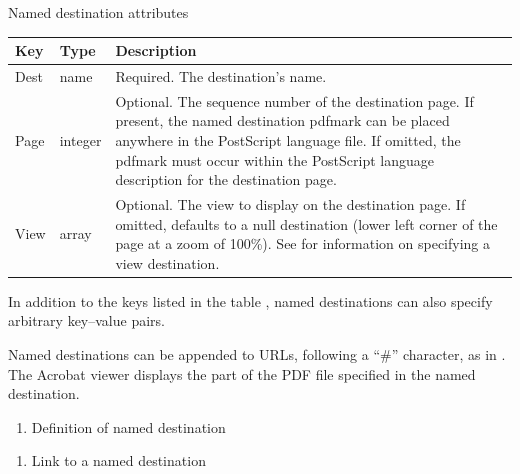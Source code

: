 \documentclass[letterpaper,12pt,english,openany,oneside]{sphinxmanual}
\begin{document}
Named destination attributes


\begin{savenotes}\sphinxattablestart
\centering
{}\label{\detokenize{pdfmark_Actions:section-5}}\nobreak
\begin{tabulary}{\linewidth}[t]{|T|T|T|}
\hline
\sphinxstyletheadfamily 
Key
&\sphinxstyletheadfamily 
Type
&\sphinxstyletheadfamily 
Description
\\
\hline
Dest
&
name
&
Required. The destination’s name.
\\
\hline
Page
&
integer
&
Optional. The sequence number of the destination page. If present, the named destination pdfmark can be placed anywhere in the PostScript language file. If omitted, the pdfmark must occur within the PostScript language description for the destination page.
\\
\hline
View
&
array
&
Optional. The view to display on the destination page. If omitted, defaults to a null destination (lower left corner of the page at a zoom of 100\%). See  for information on specifying a view destination.
\\
\hline
\end{tabulary}
\par
\sphinxattableend\end{savenotes}

In addition to the keys listed in the table , named destinations can also specify arbitrary key–value pairs.

Named destinations can be appended to URLs, following a “\#” character, as in  . The Acrobat viewer displays the part of the PDF file specified in the named destination.
\begin{enumerate}
%
\item {} 
Definition of named destination

\end{enumerate}

\begin{sphinxVerbatim}[commandchars=\\\{\}]
\PYG{p}{[}  
     
     \PYG{p}{[} \PYG{p}{]}
     
\end{sphinxVerbatim}
\begin{enumerate}
%
\item {} 
Link to a named destination

\end{enumerate}
\end{document}
